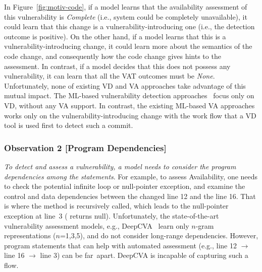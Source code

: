 In Figure~\ref{fig:motiv-code}, if a model learns that the
availability assessment of this vulnerability is {\em Complete} (i.e.,
system could be completely unavailable), it could learn that this
change is a vulnerability-introducing one (i.e., the detection outcome
is positive). On the other hand, if a model learns that this is a
vulnerability-introducing change, it could learn more about the
semantics of the code change, and consequently how the code change
gives hints to the assessment. In contrast, if a model decides that
this does not possess any vulnerability, it can learn that all the VAT
outcomes must be {\em None}. Unfortunately, none of existing VD and VA
approaches take advantage of this mutual impact. The ML-based
vulnerability detection
approaches~\cite{perl2015vccfinder,zhou2017automated,chen2019large}
focus only on VD, without any VA support. In contrast, the existing
ML-based VA approaches~\cite{deepCVA-ase21} works only on the
vulnerability-introducing change with the work flow that a VD tool is
used first to detect such a commit.


\subsubsection{{\bf Observation 2} [Program Dependencies]}

{\em To detect and assess a vulnerability, a model needs to consider
  the program dependencies among the statements}. For example, to
assess Availability, one needs to check the potential infinite loop or
null-pointer exception, and examine the control and data dependencies
between the changed line 12 and the line 16. That is where the method
 is recursively called, which leads to the null-pointer
exception at line~3 ( returns
null). Unfortunately, the state-of-the-art vulnerability assessment
models, e.g., DeepCVA~\cite{deepCVA-ase21} learn only $n$-gram
representations ($n$=1,3,5), and do not consider long-range
dependencies. However, program statements that can help with automated
assessment (e.g., line 12 $\rightarrow$ line 16 $\rightarrow$ line 3)
can be far~apart.
DeepCVA is incapable of capturing such a flow.


